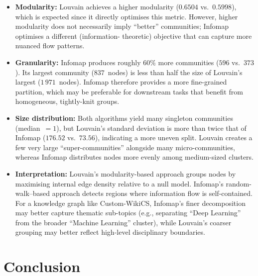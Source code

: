 \documentclass[12pt,a4paper]{article}
\begin{document}
\begin{itemize}
    \item \textbf{Modularity:} Louvain achieves a higher modularity ($0.6504$
          vs.\ $0.5998$), which is expected since it directly optimises this
          metric.  However, higher modularity does not necessarily imply
          ``better'' communities; Infomap optimises a different (information-
          theoretic) objective that can capture more nuanced flow patterns.

    \item \textbf{Granularity:} Infomap produces roughly $60\%$ more
          communities ($596$ vs.\ $373$).  Its largest community ($837$~nodes)
          is less than half the size of Louvain's largest ($1\,971$~nodes).
          Infomap therefore provides a more fine-grained partition, which may
          be preferable for downstream tasks that benefit from homogeneous,
          tightly-knit groups.

    \item \textbf{Size distribution:} Both algorithms yield many singleton
          communities (median~$= 1$), but Louvain's standard deviation is
          more than twice that of Infomap ($176.52$ vs.\ $73.56$), indicating
          a more uneven split.  Louvain creates a few very large
          ``super-communities'' alongside many micro-communities, whereas
          Infomap distributes nodes more evenly among medium-sized clusters.

    \item \textbf{Interpretation:} Louvain's modularity-based approach groups
          nodes by maximising internal edge density relative to a null model.
          Infomap's random-walk--based approach detects regions where
          information flow is self-contained.  For a knowledge graph like
          Custom-WikiCS, Infomap's finer decomposition may better capture
          thematic sub-topics (e.g., separating ``Deep Learning'' from the
          broader ``Machine Learning'' cluster), while Louvain's coarser
          grouping may better reflect high-level disciplinary boundaries.
\end{itemize}

\section{Conclusion}
\end{document}
